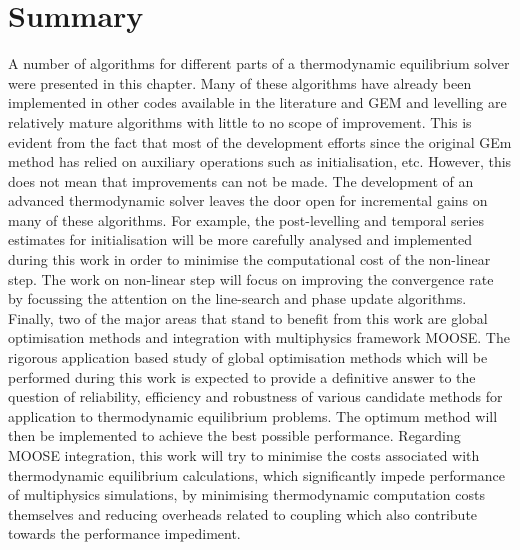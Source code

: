 \section{Summary}
	A number of algorithms for different parts of a thermodynamic equilibrium solver were presented in this chapter. Many of these algorithms have already been implemented in other codes available in the literature and GEM and levelling are relatively mature algorithms with little to no scope of improvement. This is evident from the fact that most of the development efforts since the original GEm method has relied on auxiliary operations such as initialisation, etc. However, this does not mean that improvements can not be made.  The development of an advanced thermodynamic solver leaves the door open for incremental gains on many of these algorithms.
For example, the post-levelling and temporal series estimates for initialisation will be more carefully analysed and implemented during this work in order to minimise the computational cost of the non-linear step. The work on non-linear step will focus on improving the convergence rate by focussing the attention on the line-search and phase update algorithms. Finally, two of the major areas that stand to benefit from this work are global optimisation methods and integration with multiphysics framework {MOOSE}. The rigorous application based study of global optimisation methods which will be performed during this work is expected to provide a definitive answer to the question of reliability, efficiency and robustness of various candidate methods for application to thermodynamic equilibrium problems. The optimum method will then be implemented to achieve the best possible performance. Regarding {MOOSE} integration, this work will try to minimise the costs associated with thermodynamic equilibrium calculations, which significantly impede performance of multiphysics simulations, by minimising thermodynamic computation costs themselves  and reducing overheads  related to coupling which also contribute towards the performance impediment.
